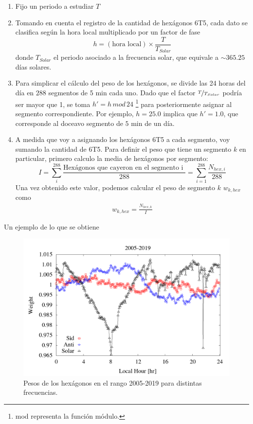       \begin{enumerate}
        \item Fijo un periodo a estudiar $T$
        \item Tomando en cuenta el registro de la cantidad de hexágonos 6T5, cada dato se clasifica según la hora local multiplicado por un factor de fase
        \begin{equation*}
          h = (\text{hora local})\times \frac{T}{T_{Solar}}
        \end{equation*}
        donde $T_{Solar}$ el periodo asociado a la frecuencia solar, que equivale a $\sim 365.25$  días solares. 
        \item Para simplicar el cálculo del peso de los hexágonos, se divide las 24 horas del día en $288$ segmentos de 5 min cada uno. Dado que el factor $\nicefrac{T}{T_{Solar}}$ podría ser mayor que 1, se toma $h' = h\, mod \,24$ \footnote{mod representa la función módulo.} para posteriormente asignar al segmento correspondiente. Por ejemplo, $h=25.0$ implica que $h'= 1.0$, que corresponde al doceavo segmento de $5$ min de un día.
       \item A medida que voy a asignando los hexágonos 6T5 a cada segmento, voy sumando la cantidad de 6T5. Para definir el peso que tiene un segmento $k$ en particular, primero calculo la media de hexágonos por segmento:
       \begin{equation}
         I = \sum^{288}_i \frac{\text{Hexágonos que cayeron en el segmento  i }}{288} = \sum^{288}_{i=1} \frac{N_{hex, i}}{288}
       \end{equation}
       Una vez obtenido este valor, podemos calcular el peso de segmento $k$  $w_{k,hex}$  como
        \begin{align}
         w_{k,hex}= \frac{N_{hex, k}}{I}
         \end{align} 
      \end{enumerate}

      Un ejemplo de lo que se obtiene


        \begin{figure}[H]
          \centering
              \includegraphics[width=0.85\linewidth]{../report_2_27_04_2020/Graficos/weigth2005-2019.png}
              \caption{Pesos de los hexágonos en el rango 2005-2019 para distintas frecuencias.}
              \label{fig:pesos_ejemplo}
        \end{figure}


